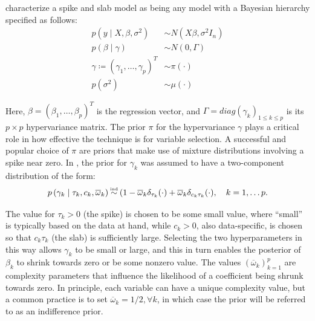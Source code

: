 \documentclass[11pt]{article}
\newcommand\myeq{\stackrel{\mathclap{\normalfont\mbox{\tiny ind}}}{\sim}}
\begin{document}
\cite{ishwaran2005spike} characterize a spike and slab model as being any model with a Bayesian hierarchy specified as follows:
\begin{align*}
	p(y \mid X, \beta, \sigma^2) &\sim N( X\beta, \sigma^2 I_n)	\\
	p(\beta \mid \gamma) &\sim N (0, \Gamma) \\
	\gamma \coloneqq (\gamma_1, \ldots, \gamma_p)^T &\sim \pi (\cdot) \\
	p(\sigma^2) &\sim \mu( \cdot )
\end{align*}

Here, $\beta = (\beta_1, \ldots, \beta_p)^T$ is the regression vector, and $\Gamma = diag(\gamma_k)_{1 \leq k \leq p}$ is its $p \times p$ hypervariance matrix. The prior $\pi$ for the hypervariance $\gamma$ plays a critical role in how effective the technique is for variable selection. A successful and popular choice of $\pi$ are priors that make use of mixture distributions involving a spike near zero. In \cite{george_and_mcculloch}, the prior for $\gamma_k$ was assumed to have a two-component distribution of the form:
\begin{equation*}
	p \left( \gamma_k \mid \tau_k, c_k, \overline{\omega}_k \right) \myeq (1 - \overline{\omega}_k \delta_{\tau_k} (\cdot) + \overline{\omega}_k \delta_{c_k \tau_k} (\cdot), \quad k = 1, \ldots p.
\end{equation*}

 The value for $\tau_k > 0$ (the spike) is chosen to be some small value, where ``small'' is typically based on the data at hand, while $c_k > 0$, also data-specific, is chosen so that $c_k \tau_k$ (the slab) is sufficiently large. Selecting the two hyperparameters in this way allows $\gamma_k$ to be small or large, and this in turn enables the posterior of $\beta_k$ to shrink towards zero or be some nonzero value. The values $(\overline{\omega}_k)_{k=1}^p$ are complexity parameters that influence the likelihood of a coefficient being shrunk towards zero. In principle, each variable can have a unique complexity value, but a common practice is to set $\overline{\omega}_k = 1/2, \forall k$, in which case the prior will be referred to as an indifference prior. \\
\end{document}
